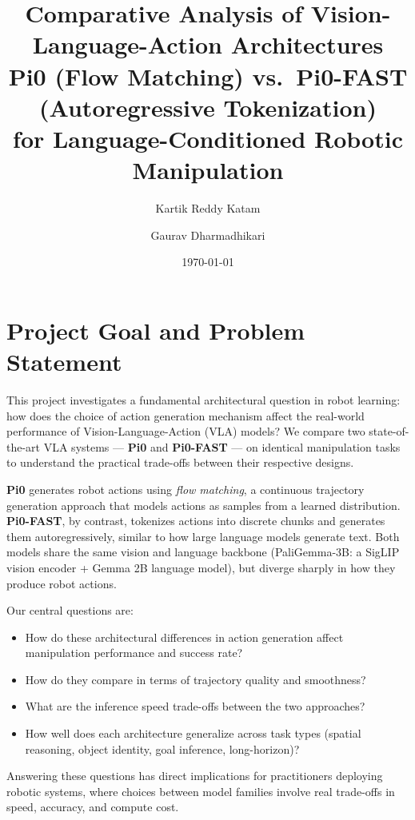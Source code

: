 \documentclass[11pt,letterpaper]{article}
\title{\textbf{Comparative Analysis of Vision-Language-Action Architectures} \\[0.4em]
  \large Pi0 (Flow Matching) vs.\ Pi0-FAST (Autoregressive Tokenization) \\
  for Language-Conditioned Robotic Manipulation}
\author[1]{Kartik Reddy Katam}
\author[1]{Gaurav Dharmadhikari}
\affil[1]{San Jos\'{e} State University, CMPE 188 -- Machine Learning}
\affil[ ]{\texttt{kartikreddy.katam@gmail.com}, \texttt{gaurav.dharrmadhikari@sjsu.edu}}
\affil[ ]{SJSU IDs: 015765542, 017038177}
\affil[ ]{GitHub: \url{https://github.com/KartikKatam/libero-vla-analysis}}
\date{\today}
\begin{document}
\maketitle

\section{Project Goal and Problem Statement}

This project investigates a fundamental architectural question in robot learning: how does the choice of action generation mechanism affect the real-world performance of Vision-Language-Action (VLA) models? We compare two state-of-the-art VLA systems --- \textbf{Pi0} and \textbf{Pi0-FAST} --- on identical manipulation tasks to understand the practical trade-offs between their respective designs.

\textbf{Pi0} generates robot actions using \emph{flow matching}, a continuous trajectory generation approach that models actions as samples from a learned distribution. \textbf{Pi0-FAST}, by contrast, tokenizes actions into discrete chunks and generates them autoregressively, similar to how large language models generate text. Both models share the same vision and language backbone (PaliGemma-3B: a SigLIP vision encoder + Gemma 2B language model), but diverge sharply in how they produce robot actions.

Our central questions are:

\begin{itemize}[noitemsep,topsep=2pt]
  \item How do these architectural differences in action generation affect manipulation performance and success rate?
  \item How do they compare in terms of trajectory quality and smoothness?
  \item What are the inference speed trade-offs between the two approaches?
  \item How well does each architecture generalize across task types (spatial reasoning, object identity, goal inference, long-horizon)?
\end{itemize}

Answering these questions has direct implications for practitioners deploying robotic systems, where choices between model families involve real trade-offs in speed, accuracy, and compute cost.
\end{document}

